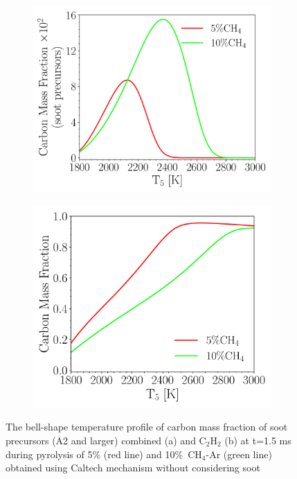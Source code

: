 \begin{figure}[H]
	\centering
	\begin{subfigure}[t]{0.4\textwidth}
		\includegraphics[width=1\textwidth]{Figures/Results/Shocktube/Agafonov2016_cvr/SPC_cmf.pdf}
	\end{subfigure}
	\begin{subfigure}[t]{0.4\textwidth}
		\includegraphics[width=1\textwidth]{Figures/Results/Shocktube/Agafonov2016_cvr/C2H2_cmf.pdf}
	\end{subfigure}
	\caption{The bell-shape temperature profile of carbon mass fraction of soot precursors (A2 and larger) combined (a) and $\mathrm{C_2H_2}$ (b) at t=1.5 ms during pyrolysis of 5\% (red line) and 10\%~$\mathrm{CH_4}$-Ar (green line) obtained using Caltech mechanism without considering soot}
	\label{fig:SPC_cmf_cvr} 
\end{figure}




